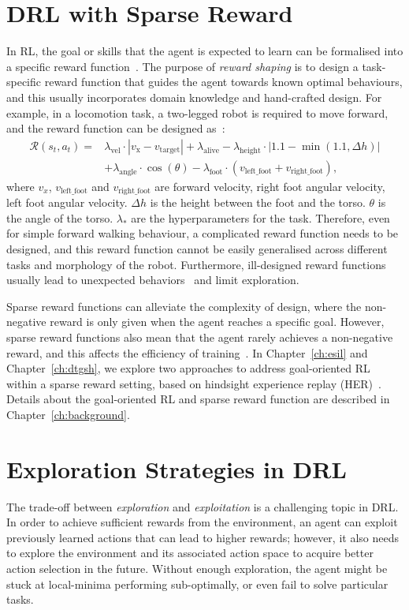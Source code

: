 \section{DRL with Sparse Reward}
In RL, the goal or skills that the agent is expected to learn can be formalised into a specific reward function~\cite{sutton2018reinforcement}. The purpose of \textit{reward shaping} is to design a task-specific reward function that guides the agent towards known optimal behaviours, and this usually incorporates domain knowledge and hand-crafted design. For example, in a locomotion task, a two-legged robot is required to move forward, and the reward function can be designed as~\cite{lee2018composing}:
\begin{align}
\mathcal{R}(s_{t}, a_{t}) = & \lambda_{\text{vel}}\cdot |v_{\text{x}} - v_{\text{target}}| + \lambda_{\text{alive}} - \lambda_{\text{height}}\cdot |1.1 - \min (1.1, \Delta h)| \\
        & + \lambda_{\text{angle}}\cdot \cos (\theta) -  \lambda_{\text{foot}}\cdot(v_{\text{left\_foot}} + v_{\text{right\_foot}}), \nonumber
\label{eq:designed_reward_function}
\end{align}
where $v_{x}$, $v_{\text{left\_foot}}$ and $v_{\text{right\_foot}}$ are forward velocity, right foot angular velocity, left foot angular velocity. $\Delta h$ is the height between the foot and the torso. $\theta$ is the angle of the torso. $\lambda_{*}$ are the hyperparameters for the task. Therefore, even for simple forward walking behaviour, a complicated reward function needs to be designed, and this reward function cannot be easily generalised across different tasks and morphology of the robot. Furthermore, ill-designed reward functions usually lead to unexpected behaviors~\cite{riedmiller2018learning} and limit exploration. 

Sparse reward functions can alleviate the complexity of design, where the non-negative reward is only given when the agent reaches a specific goal. However, sparse reward functions also mean that the agent rarely achieves a non-negative reward, and this affects the efficiency of training~\cite{andrychowicz2017hindsight}. In Chapter~\ref{ch:esil} and Chapter~\ref{ch:dtgsh}, we explore two approaches to address goal-oriented RL within a sparse reward setting, based on hindsight experience replay (HER)~\cite{andrychowicz2017hindsight}. Details about the goal-oriented RL and sparse reward function are described in Chapter~\ref{ch:background}.  
\newpage

\section{Exploration Strategies in DRL}
The trade-off between \textit{exploration} and \textit{exploitation} is a challenging topic in DRL. In order to achieve sufficient rewards from the environment, an agent can exploit previously learned actions that can lead to higher rewards; however, it also needs to explore the environment and its associated action space to acquire better action selection in the future. Without enough exploration, the agent might be stuck at local-minima performing sub-optimally, or even fail to solve particular tasks.

